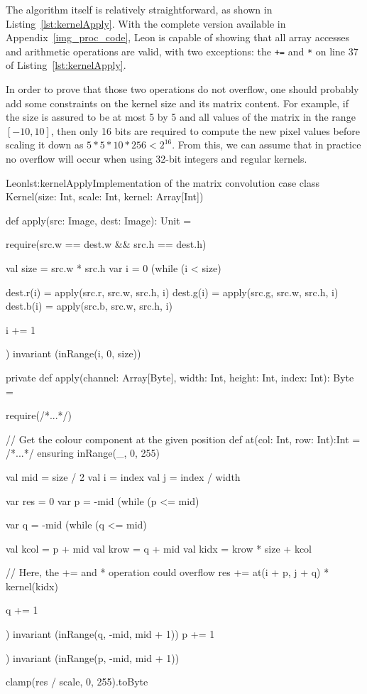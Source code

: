 \documentclass[a4paper,twoside]{article}
\newcommand{\InlineS}[1]{\lstinline[language=Leon]|#1|}
\newcommand{\RefApp}[1]{Appendix~\ref{#1}}
\newcommand{\RefCode}[1]{Listing~\ref{#1}}
\begin{document}
The algorithm itself is relatively straightforward, as shown in
\RefCode{lst:kernelApply}. With the complete version available in
\RefApp{img_proc_code}, Leon is capable of showing that all array accesses and
arithmetic operations are valid, with two exceptions: the \InlineS{+=} and
\InlineS{*} on line 37 of \RefCode{lst:kernelApply}.

In order to prove that those two operations do not overflow, one should probably
add some constraints on the kernel size and its matrix content. For example, if
the size is assured to be at most 5 by 5 and all values of the matrix in the
range $[-10, 10]$, then only 16 bits are required to compute the new pixel
values before scaling it down as $5 * 5 * 10 * 256 < 2^{16}$. From this, we can
assume that in practice no overflow will occur when using 32-bit integers and
regular kernels.

\lstset{numbers=left}
\begin{Code}{Leon}{lst:kernelApply}{Implementation of the matrix convolution}
case class Kernel(size: Int, scale: Int, kernel: Array[Int]) {
  def apply(src: Image, dest: Image): Unit = {
    require(src.w == dest.w && src.h == dest.h)

    val size = src.w * src.h
    var i = 0
    (while (i < size) {
      dest.r(i) = apply(src.r, src.w, src.h, i)
      dest.g(i) = apply(src.g, src.w, src.h, i)
      dest.b(i) = apply(src.b, src.w, src.h, i)

      i += 1
    }) invariant (inRange(i, 0, size))
  }

  private def apply(channel: Array[Byte],
                    width: Int, height: Int, index: Int): Byte = {
    require(/*...*/)

    // Get the colour component at the given position
    def at(col: Int, row: Int):Int = {/*...*/} ensuring { inRange(_, 0, 255) }

    val mid = size / 2
    val i = index %
    val j = index / width

    var res = 0
    var p   = -mid
    (while (p <= mid) {
      var q = -mid
      (while (q <= mid) {
        val kcol = p + mid
        val krow = q + mid
        val kidx = krow * size + kcol

        // Here, the += and * operation could overflow
        res += at(i + p, j + q) * kernel(kidx)

        q += 1
      }) invariant (inRange(q, -mid, mid + 1))
      p += 1
    }) invariant (inRange(p, -mid, mid + 1))

    clamp(res / scale, 0, 255).toByte
  }
}
\end{Code}
\lstset{numbers=none}
\end{document}
